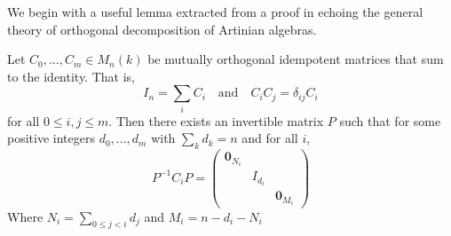 \documentclass[12pt]{article}
\begin{document}
We begin with a useful lemma extracted from a proof in \cite{schur-thesis} echoing the general theory of 
orthogonal decomposition of Artinian algebras.
\begin{lem}\label{lem:orth-decomp}
	Let $C_0,\dots,C_m\in M_n(k)$ be mutually orthogonal idempotent matrices that sum to the identity. That is, 
	\[I_n=\sum_i C_i\quad\text{and}\quad C_iC_j=\delta_{ij}C_i\]
	for all $0\le i,j\le m$. Then there exists an invertible matrix $P$ such that for some positive integers $d_0,\dots,d_m$ with $\sum_k d_k=n$ and for all $i$,
	\[P^{-1}C_iP=\begin{pmatrix}
		\mathbf{0}_{N_i} & &\\
		& I_{d_i} & \\
		& & \mathbf{0}_{M_i}
	\end{pmatrix}\]
	Where $N_i=\sum_{0\le j<i}d_j$ and $M_i=n-d_i-N_i$
\end{lem}
\end{document}
